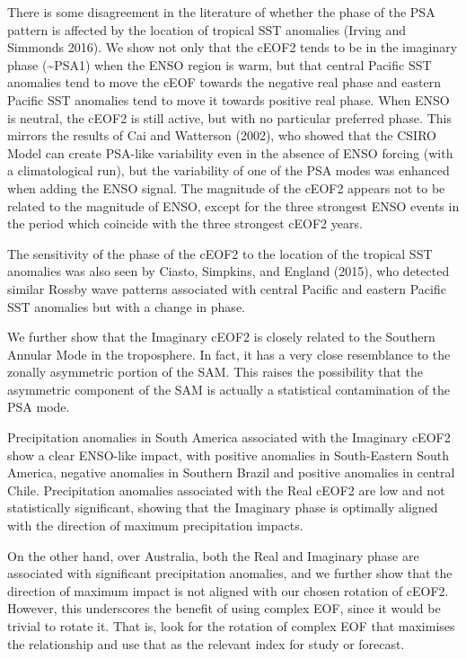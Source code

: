 \documentclass[smallextended]{svjour3}       %
\begin{document}
There is some disagreement in the literature of whether the phase of the PSA pattern is affected by the location of tropical SST anomalies (Irving and Simmonds 2016).
We show not only that the cEOF2 tends to be in the imaginary phase (\textasciitilde PSA1) when the ENSO region is warm, but that central Pacific SST anomalies tend to move the cEOF towards the negative real phase and eastern Pacific SST anomalies tend to move it towards positive real phase.
When ENSO is neutral, the cEOF2 is still active, but with no particular preferred phase.
This mirrors the results of Cai and Watterson (2002), who showed that the CSIRO Model can create PSA-like variability even in the absence of ENSO forcing (with a climatological run), but the variability of one of the PSA modes was enhanced when adding the ENSO signal.
The magnitude of the cEOF2 appears not to be related to the magnitude of ENSO, except for the three strongest ENSO events in the period which coincide with the three strongest cEOF2 years.

The sensitivity of the phase of the cEOF2 to the location of the tropical SST anomalies was also seen by Ciasto, Simpkins, and England (2015), who detected similar Rossby wave patterns associated with central Pacific and eastern Pacific SST anomalies but with a change in phase.

We further show that the Imaginary cEOF2 is closely related to the Southern Annular Mode in the troposphere.
In fact, it has a very close resemblance to the zonally asymmetric portion of the SAM.
This raises the possibility that the asymmetric component of the SAM is actually a statistical contamination of the PSA mode.

Precipitation anomalies in South America associated with the Imaginary cEOF2 show a clear ENSO-like impact, with positive anomalies in South-Eastern South America, negative anomalies in Southern Brazil and positive anomalies in central Chile.
Precipitation anomalies associated with the Real cEOF2 are low and not statistically significant, showing that the Imaginary phase is optimally aligned with the direction of maximum precipitation impacts.

On the other hand, over Australia, both the Real and Imaginary phase are associated with significant precipitation anomalies, and we further show that the direction of maximum impact is not aligned with our chosen rotation of cEOF2.
However, this underscores the benefit of using complex EOF, since it would be trivial to rotate it.
That is, look for the rotation of complex EOF that maximises the relationship and use that as the relevant index for study or forecast.
\end{document}
